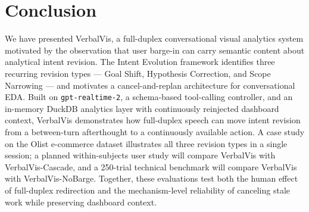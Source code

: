 \documentclass[journal]{IEEEtran}
\begin{document}
\section{Conclusion}
\label{sec:conclusion}
We have presented VerbalVis, a full-duplex conversational visual analytics system motivated by the observation that user barge-in can carry semantic content about analytical intent revision. The Intent Evolution framework identifies three recurring revision types --- Goal Shift, Hypothesis Correction, and Scope Narrowing --- and motivates a cancel-and-replan architecture for conversational EDA. Built on \texttt{gpt-realtime-2}, a schema-based tool-calling controller, and an in-memory DuckDB analytics layer with continuously reinjected dashboard context, VerbalVis demonstrates how full-duplex speech can move intent revision from a between-turn afterthought to a continuously available action. A case study on the Olist e-commerce dataset illustrates all three revision types in a single session; a planned within-subjects user study will compare VerbalVis with VerbalVis-Cascade, and a 250-trial technical benchmark will compare VerbalVis with VerbalVis-NoBarge. Together, these evaluations test both the human effect of full-duplex redirection and the mechanism-level reliability of canceling stale work while preserving dashboard context.


\end{document}
